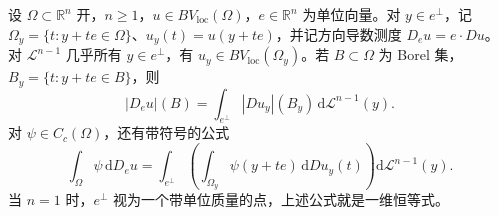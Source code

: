 \begin{theorem}\label{g3:thm:bv-directional-slicing}
	设 \(\Omega\subset\mathbb R^n\) 开，\(n\ge1\)，\(u\in BV_{\mathrm{loc}}(\Omega)\)，\(e\in\mathbb R^n\) 为单位向量。对 \(y\in e^\perp\)，记 \(\Omega_y=\{t:y+te\in\Omega\}\)、\(u_y(t)=u(y+te)\)，并记方向导数测度 \(D_eu=e\cdot Du\)。对 \(\mathcal L^{n-1}\) 几乎所有 \(y\in e^\perp\)，有 \(u_y\in BV_{\mathrm{loc}}(\Omega_y)\)。若 \(B\subset\Omega\) 为 Borel 集，\(B_y=\{t:y+te\in B\}\)，则
	\begin{equation}\label{g3:eq:bv-directional-disintegration}
		|D_eu|(B)=\int_{e^\perp}|Du_y|(B_y)\,\mathrm d\mathcal L^{n-1}(y).
	\end{equation}
	对 \(\psi\in C_c(\Omega)\)，还有带符号的公式
	\[
		\int_\Omega\psi\,\mathrm dD_eu
		=\int_{e^\perp}\left(\int_{\Omega_y}\psi(y+te)\,\mathrm dDu_y(t)\right)
		\mathrm d\mathcal L^{n-1}(y).
	\]
	当 \(n=1\) 时，\(e^\perp\) 视为一个带单位质量的点，上述公式就是一维恒等式。
\end{theorem}

